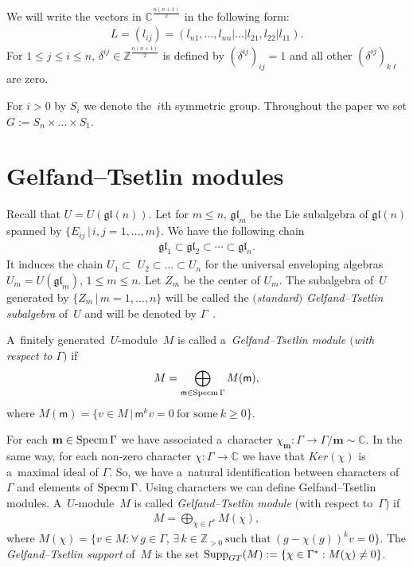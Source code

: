 \documentclass[11pt]{article}
\DeclareMathOperator\Supp{Supp} \DeclareMathOperator\codim{codim} \DeclareMathOperator\Y{Y}
\numberwithin{equation}{section}
\begin{document}
We will write the vectors in $\mathbb{C}^{\frac{n(n+1)}{2}}$ in the following form:
\begin{gather*}
L=(l_{ij})=(l_{n1},\dots,l_{nn}| \dots|l_{21}, l_{22}|l_{11}).
\end{gather*}
For $1\leq j \leq i \leq n$, $\delta^{ij} \in {\mathbb Z}^{\frac{n(n+1)}{2}}$ is def\/ined by $(\delta^{ij})_{ij}=1$ and
all other $(\delta^{ij})_{k\ell}$ are zero.

For $i>0$ by $S_i$ we denote the~$i$th symmetric group.
Throughout the paper we set $G:=S_n\times\dots \times S_1$.

\section{Gelfand--Tsetlin modules}
\label{section3}

Recall that $U=U(\mathfrak{gl} (n))$.
Let for $m\leqslant n$, $\mathfrak{gl}_{m}$ be the Lie subalgebra of $\mathfrak{gl} (n)$ spanned by $\{E_{ij} \,|\,
i,j=1,\ldots,m \}$.
We have the following chain
\begin{gather*}
\mathfrak{gl}_1\subset \mathfrak{gl}_2\subset \cdots \subset \mathfrak{gl}_n.
\end{gather*}
It induces the chain $U_1\subset$ $U_2\subset \dots \subset U_n$ for the universal enveloping algebras
$U_{m}=U(\mathfrak{gl}_{m})$, $1\leq m\leq n$.
Let $Z_{m}$ be the center of $U_{m}$.
The subalgebra of~$U$ generated by $\{Z_m \,|\, m=1,\ldots, n \}$ will be called the \emph{$($standard$)$ Gelfand--Tsetlin
subalgebra} of~$U$ and will be denoted by ${{\Gamma}}$~\cite{DFO3}.

\begin{Definition}
A~f\/initely generated~$U$-module~$M$ is called a~\emph{Gelfand--Tsetlin module $($with respect to ${\Gamma})$} if
\begin{gather*}
M=\bigoplus_{\mathsf m\in\operatorname{Specm}{\Gamma}}M(\mathsf m),
\end{gather*}
where $M(\mathsf m)=\{v\in M\,|\, \mathsf m^{k}v=0~\text{for some}~k\geq 0\}$.
\end{Definition}

For each $\mathbf m\in\operatorname{Specm}{\Gamma}$ we have associated a~character $\chi_{\mathbf m}:{\Gamma}\rightarrow{\Gamma}/\mathbf
m\sim\mathbb{C}$.
In the same way, for each non-zero character $\chi:{\Gamma}\rightarrow\mathbb{C}$ we have that $Ker(\chi)$ is a~maximal
ideal of ${\Gamma}$.
So, we have a~natural identif\/ication between characters of ${\Gamma}$ and elements of $\operatorname{Specm}{\Gamma}$.
Using characters we can def\/ine Gelfand--Tsetlin modules.
A~$U$-module~$M$ is called \emph{Gelfand--Tsetlin module} (with respect to~$\Gamma$) if
\begin{gather*}
M=\bigoplus_{\chi\in\Gamma^{*}}M(\chi),
\end{gather*}
where $M(\chi)=\{v\in M: \forall\, g\in\Gamma, \, \exists\, k\in\mathbb{Z}_{>0}~\text{such that}~(g-\chi(g))^{k}v=0 \}$.
The {\it Gelfand--Tsetlin support} of~$M$ is the set $\Supp_{\rm GT}(M):=\{\chi\in{\Gamma}^{*}:M(\chi)\neq 0\}$.
\end{document}
